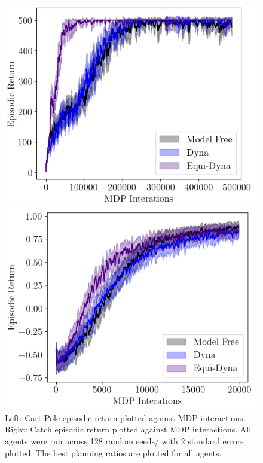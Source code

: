 \documentclass[mlabstract]{jmlr}
\begin{document}
\begin{figure}
	\centering
	\begin{minipage}[b]{.5\textwidth}
		\centering
		\includegraphics[width=\textwidth]{Figures/best_cp.png}
	\end{minipage}%
	\begin{minipage}[b]{.5\textwidth}
		\centering
		\includegraphics[width=\textwidth]{Figures/best_ctch.png}
	\end{minipage}%
	\caption{Left: Cart-Pole episodic return plotted against MDP interactions. Right: Catch episodic return plotted against MDP interactions. All agents were run across 128 random seeds/ with 2 standard errors plotted. The best planning ratios are plotted for all agents.}
	\label{fig:joint}
\end{figure}
\end{document}

